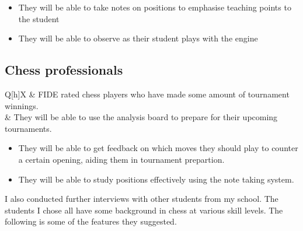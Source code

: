 \vspace{0.3cm}
\begin{itemize}
  \item{They will be able to take notes on positions to emphasise
    teaching points to the student}
  \item They will be able to observe as their student plays with the engine
\end{itemize}

\subsection*{Chess professionals}
\begin{tblr}{Q[h]X}
   & FIDE rated chess players who have made some 
  amount of tournament winnings.\\
   & They will be able to use the 
  analysis board to prepare for their upcoming tournaments.\\
\end{tblr}

\vspace{0.3cm}
\begin{itemize}
  \item{They will be able to get feedback on which moves they should play
    to counter a certain opening, aiding them in tournament prepartion.}
  \item{They will be able to study positions effectively using the note taking
    system.}
\end{itemize}


I also conducted further interviews with other students
from my school. The students I chose all have some
background in chess at various skill levels. The following 
is some of the features they suggested. \newpage

